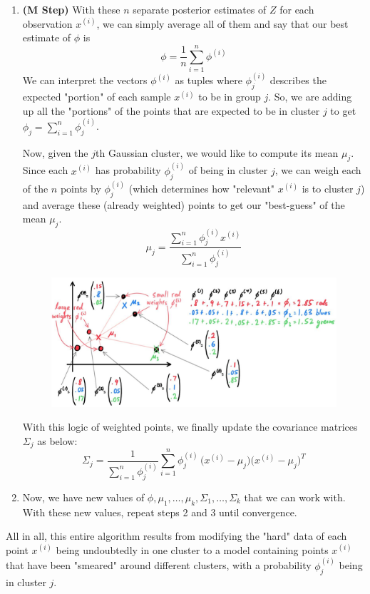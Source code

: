 \documentclass{article}
\begin{document}
\begin{definition}[EM Algorithm]
\begin{enumerate}
          \item \textbf{(M Step)} With these $n$ separate posterior estimates of $Z$ for each observation $x^{(i)}$, we can simply average all of them and say that our best estimate of $\phi$ is
          \[\phi = \frac{1}{n} \sum_{i=1}^n \phi^{(i)}\]
          We can interpret the vectors $\phi^{(i)}$ as tuples where $\phi^{(i)}_j$ describes the expected "portion" of each sample $x^{(i)}$ to be in group $j$. So, we are adding up all the "portions" of the points that are expected to be in cluster $j$ to get $\phi_j = \sum_{i=1}^n \phi_j^{(i)}$.

          Now, given the $j$th Gaussian cluster, we would like to compute its mean $\mu_j$. Since each $x^{(i)}$ has probability $\phi^{(i)}_j$ of being in cluster $j$, we can weigh each of the $n$ points by $\phi^{(i)}_j$ (which determines how "relevant" $x^{(i)}$ is to cluster $j$) and average these (already weighted) points to get our "best-guess" of the mean $\mu_j$.
          \[\mu_j = \frac{\sum_{i=1}^n \phi^{(i)}_j x^{(i)}}{\sum_{i=1}^n \phi_j^{(i)}}\]

          \begin{figure}[H]
            \centering 
            \includegraphics[scale=0.27]{img/weighted_means.jpg}
            \caption{} 
            \label{fig:weighted_means}
          \end{figure}

          With this logic of weighted points, we finally update the covariance matrices $\Sigma_j$ as below:
          \[\Sigma_j = \frac{1}{\sum_{i=1}^n \phi_j^{(i)}} \sum_{i=1}^n \phi^{(i)}_j \,\big(x^{(i)} - \mu_j\big)\big(x^{(i)} - \mu_j\big)^T\]

          \item Now, we have new values of $\phi, \mu_1, \ldots, \mu_k, \Sigma_1, \ldots, \Sigma_k$ that we can work with. With these new values, repeat steps 2 and 3 until convergence.
        \end{enumerate}

        All in all, this entire algorithm results from modifying the "hard" data of each point $x^{(i)}$ being undoubtedly in one cluster to a model containing points $x^{(i)}$ that have been "smeared" around different clusters, with a probability $\phi_j^{(i)}$ being in cluster $j$. 
      \end{definition}
\end{document}
